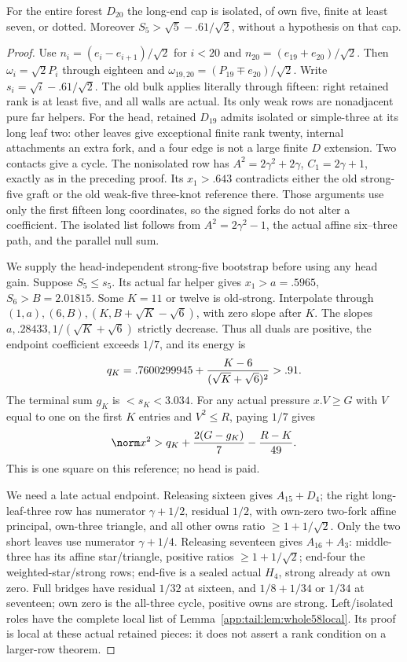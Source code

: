 \begin{lemma}
\label{app:tail:lem:D20early}
For the entire forest $D_{20}$ the long-end cap is isolated, of
own five, finite at least seven, or dotted. Moreover
$S_5>\sqrt5-.61/\sqrt2$, without a hypothesis on that cap.
\end{lemma}
\begin{proof}
Use $n_i=(e_i-e_{i+1})/\sqrt2$ for $i<20$ and
$n_{20}=(e_{19}+e_{20})/\sqrt2$. Then
$\omega_i=\sqrt2P_i$ through eighteen and
$\omega_{19,20}=(P_{19}\mp e_{20})/\sqrt2$.
Write $s_i=\sqrt i-.61/\sqrt2$.
The old bulk applies literally through fifteen: right retained
rank is at least five, and all walls are actual. Its only weak
rows are nonadjacent pure far helpers.
For the head, retained $D_{19}$ admits isolated or simple-three
at its long leaf two: other leaves give exceptional finite rank
twenty, internal attachments an extra fork, and a four edge is
not a large finite $D$ extension. Two contacts give a cycle.
The nonisolated row has $A^2=2\gamma^2+2\gamma$,
$C_1=2\gamma+1$, exactly as in the preceding proof.
Its $x_1>.643$ contradicts either the old strong-five graft
or the old weak-five three-knot reference there. Those arguments
use only the first fifteen long coordinates, so the signed
forks do not alter a coefficient. The isolated list follows
from $A^2=2\gamma^2-1$, the actual affine six--three path,
and the parallel null sum.

We supply the head-independent strong-five bootstrap before using
any head gain. Suppose $S_5\le s_5$. Its actual far helper gives
$x_1>a=.5965$, $S_6>B=2.01815$.
Some $K=11$ or twelve is old-strong. Interpolate through
$(1,a),(6,B),(K,B+\sqrt K-\sqrt6)$, with zero slope after $K$.
The slopes $a,.28433,1/(\sqrt K+\sqrt6)$ strictly decrease.
Thus all duals are positive, the endpoint coefficient exceeds
$1/7$, and its energy is
\[
 q_K=.7600299945+{K-6\over(\sqrt K+\sqrt6)^2}>.91.
\]
The terminal sum $g_K$ is $<s_K<3.034$.
For any actual pressure $x.V\ge G$ with $V$ equal to one on
the first $K$ entries and $V^2\le R$, paying $1/7$ gives
\begin{equation}\label{app:tail:eq:D20weak5pay}
 \norm x^2>q_K+{2(G-g_K)\over7}-{R-K\over49}.
\end{equation}
This is one square on this reference; no head is paid.

We need a late actual endpoint. Releasing sixteen gives
$A_{15}+D_4$; the right long-leaf-three row has numerator
$\gamma+1/2$, residual $1/2$, with own-zero two-fork affine
principal, own-three triangle, and all other owns ratio
$\ge1+1/\sqrt2$. Only the two short leaves use numerator
$\gamma+1/4$. Releasing seventeen gives $A_{16}+A_3$:
middle-three has its affine star/triangle, positive ratios
$\ge1+1/\sqrt2$; end-four the weighted-star/strong rows;
end-five is a sealed actual $H_4$, strong already at own zero.
Full bridges have residual $1/32$ at sixteen, and
$1/8+1/34$ or $1/34$ at seventeen; own zero is the all-three
cycle, positive owns are strong. Left/isolated roles have the
complete local list of Lemma~\ref{app:tail:lem:whole58local}.
Its proof is local at these actual retained pieces: it does not
assert a rank condition on a larger-row theorem.


\end{proof}
